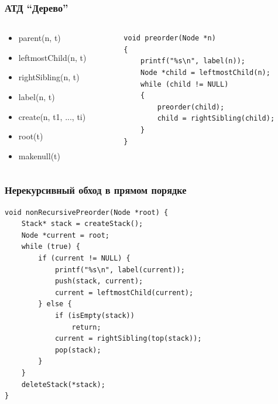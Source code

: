 \documentclass[xetex,mathserif,serif]{beamer}
\begin{document}
    \begin{frame}[fragile]
        \frametitle{АТД ``Дерево''}
        \begin{columns}
            \begin{column}{0.6\textwidth}
                \begin{itemize}
                    \item parent(n, t)
                    \item leftmostChild(n, t)
                    \item rightSibling(n, t)
                    \item label(n, t)
                    \item create(n, t1, ..., ti)
                    \item root(t)
                    \item makenull(t)
                \end{itemize}
            \end{column}
            \begin{column}{0.4\textwidth}
                \begin{footnotesize}
                    \begin{verbatim}
void preorder(Node *n)
{
    printf("%s\n", label(n));
    Node *child = leftmostChild(n);
    while (child != NULL)
    {
        preorder(child);
        child = rightSibling(child);
    }
}
                    \end{verbatim}
                \end{footnotesize}
            \end{column}
        \end{columns}
    \end{frame}

    \begin{frame}[fragile]
        \frametitle{Нерекурсивный обход в прямом порядке}
        \begin{footnotesize}
            \begin{verbatim}
void nonRecursivePreorder(Node *root) {
    Stack* stack = createStack();
    Node *current = root;
    while (true) {
        if (current != NULL) {
            printf("%s\n", label(current));
            push(stack, current);
            current = leftmostChild(current);
        } else {
            if (isEmpty(stack))
                return;
            current = rightSibling(top(stack));
            pop(stack);
        }
    }
    deleteStack(*stack);
}
            \end{verbatim}
        \end{footnotesize}
    \end{frame}
\end{document}
